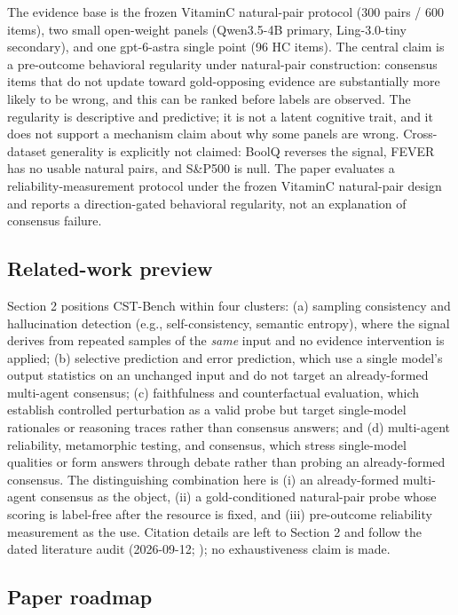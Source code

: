\documentclass[11pt]{article}
\begin{document}
The evidence base is the frozen VitaminC natural-pair protocol (300 pairs / 600 items), two small open-weight panels (Qwen3.5-4B primary, Ling-3.0-tiny secondary), and one gpt-6-astra single point (96 HC items). The central claim is a pre-outcome behavioral regularity under natural-pair construction: consensus items that do not update toward gold-opposing evidence are substantially more likely to be wrong, and this can be ranked before labels are observed. The regularity is descriptive and predictive; it is not a latent cognitive trait, and it does not support a mechanism claim about why some panels are wrong. Cross-dataset generality is explicitly not claimed: BoolQ reverses the signal, FEVER has no usable natural pairs, and S\&P500 is null. The paper evaluates a reliability-measurement protocol under the frozen VitaminC natural-pair design and reports a direction-gated behavioral regularity, not an explanation of consensus failure.

\subsection{Related-work preview}

Section 2 positions CST-Bench within four clusters: (a) sampling consistency and hallucination detection (e.g., self-consistency, semantic entropy), where the signal derives from repeated samples of the \emph{same} input and no evidence intervention is applied; (b) selective prediction and error prediction, which use a single model's output statistics on an unchanged input and do not target an already-formed multi-agent consensus; (c) faithfulness and counterfactual evaluation, which establish controlled perturbation as a valid probe but target single-model rationales or reasoning traces rather than consensus answers; and (d) multi-agent reliability, metamorphic testing, and consensus, which stress single-model qualities or form answers through debate rather than probing an already-formed consensus. The distinguishing combination here is (i) an already-formed multi-agent consensus as the object, (ii) a gold-conditioned natural-pair probe whose scoring is label-free after the resource is fixed, and (iii) pre-outcome reliability measurement as the use. Citation details are left to Section 2 and follow the dated literature audit (2026-09-12; ); no exhaustiveness claim is made.

\subsection{Paper roadmap}
\end{document}
